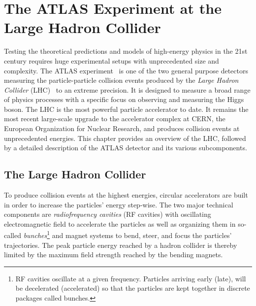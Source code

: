 
\chapter{The ATLAS Experiment at the Large Hadron Collider}
\label{chap:experiment}
Testing the theoretical predictions and models of high-energy physics in the 21st century requires huge experimental setups with unprecedented size and complexity.
The ATLAS experiment~\cite{PERF-2007-01} is one of the two general purpose detectors measuring the particle-particle collision events produced by the \emph{Large Hadron Collider} (LHC)~\cite{Evans:2008zzb} to an extreme precision. It is designed to measure a broad range of physics processes with a specific focus on observing and measuring the Higgs boson.
The LHC is the most powerful particle accelerator to date. It remains the most recent large-scale upgrade to the accelerator complex at CERN, the European Organization for Nuclear Research, and produces collision events at unprecedented energies.
This chapter provides an overview of the LHC, followed by a detailed description of the ATLAS detector and its various subcomponents.


\section{The Large Hadron Collider}
To produce collision events at the highest energies, circular accelerators are built in order to increase the particles' energy step-wise. The two major technical components are \emph{radiofrequency cavities} (RF cavities) with oscillating electromagnetic field to accelerate the particles as well as organizing them in so-called \emph{bunches}\footnote{RF cavities oscillate at a given frequency. Particles arriving early (late), will be decelerated (accelerated) so that the particles are kept together in discrete packages called bunches.} and magnet systems to bend, steer, and focus the particles' trajectories. The peak particle energy reached by a hadron collider is thereby limited by the maximum field strength reached by the bending magnets.


